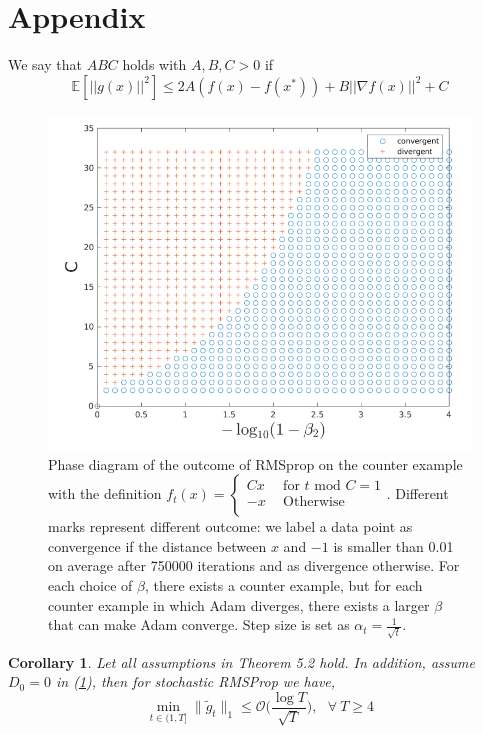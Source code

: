 \documentclass{article}
\newtheorem{corollary}{Corollary}[section]
\begin{document}
\section{Appendix}\label{app:Appendix}
We say that $ABC$ holds with $A,B,C > 0$ if
\begin{equation}\label{eqA1}
	\mathbb{E}\left[||g(x)||^2\right] \leq 2A(f(x) - f(x^*)) + B||\nabla f(x)||^2 + C\tag{A.1}
\end{equation}
\begin{figure}[h]
\label{fig1}
\centering
\includegraphics[scale = 0.4]{rmsp.png}
\caption{Phase diagram of the outcome of RMSprop on the counter example with the definition
			\(f_t(x) =
	\begin{cases}
		Cx & \ \ \text{for $t$ mod $C = 1$}\\
		-x & \ \ \text{Otherwise}\\
	\end{cases}
	\). 
	Different marks represent
	different outcome: we label a data point as convergence if the distance between $x$ and $-1$ is smaller than 0.01
	on average after 750000 iterations and as divergence otherwise. For each choice of $\beta$, there exists a counter
	example, but for each counter example in which Adam diverges, there exists a larger $\beta$ that can make Adam
	converge. Step size is set as $\alpha_t = \frac{1}{\sqrt{t}}$.}
\end{figure}
\begin{corollary}
	\label{coro51appendix}
	Let all assumptions in Theorem 5.2 hold. In addition, assume $D_0 = 0$ in (\hyperref[eq51]{1}), then for stochastic RMSProp we have,
	\[
	\min_{t \in (1, T]} \|\tilde{g}_t\|_1 \leq \mathcal{O}\Big(\frac{\log T}{\sqrt{T}}\Big), \ \ \ \forall \ T \geq 4
	\]
\end{corollary}
\end{document}
